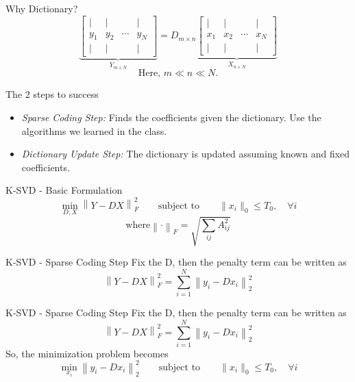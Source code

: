 \documentclass{beamer}
\begin{document}
\begin{frame}{Why Dictionary?}
    \[
    \underbrace{\left[
    \begin{array}{cccc}
    | & | & & | \\
    y_1 & y_2 & \cdots & y_N \\
    | & | & & |
    \end{array}
    \right]}_{Y_{m \times N}}
    =
    D_{m \times n}
    \underbrace{\left[
    \begin{array}{cccc}
    | & | & & | \\
    x_1 & x_2 & \cdots & x_N \\
    | & | & & |
    \end{array}
    \right]}_{X_{n \times N}}
    \]
    \[
    \text{Here, } m \ll n \ll N.
    \]
\end{frame}

\begin{frame}{The 2 steps to success}
\begin{itemize}
    \item \textit{Sparse Coding Step:} Finds the coefficients given the
    dictionary. Use the algorithms we learned in the class.
    \item \textit{Dictionary Update Step:} The dictionary is updated assuming known and fixed coefficients. 
\end{itemize}
\end{frame}

\begin{frame}
\vfill
{}\vfill
\end{frame}


\begin{frame}{K-SVD - Basic Formulation}
    \[
    \min_{D,X} \left\| Y - DX \right\|_F^2
    \qquad
    \text{subject to}
    \qquad
    \|x_i\|_0 \leq T_0,
    \quad \forall i
    \]
    \[
    \text{where} \left\| \cdot \right\|_F = \sqrt{\sum_{ij}A_{ij}^2}
    \]
\end{frame}

\begin{frame}{K-SVD - Sparse Coding Step}
    Fix the D, then the penalty term can be written as
    \[
    \left\|Y - DX \right\|_F^2 = \sum_{i=1}^{N}\left\|y_i - Dx_i \right\|_2^2
    \]
    \vspace{1.8cm}
\end{frame}

\begin{frame}{K-SVD - Sparse Coding Step}
    Fix the D, then the penalty term can be written as
    \[
    \left\|Y - DX \right\|_F^2 = \sum_{i=1}^{N}\left\|y_i - Dx_i \right\|_2^2
    \]
    So, the minimization problem becomes
    \[
    \min_{x_i} \left\| y_i - D x_i \right\|_2^2
    \qquad
    \text{subject to}
    \qquad
    \|x_i\|_0 \leq T_0,
    \quad \forall i
    \]
    \vspace{0.7cm}
\end{frame}
\end{document}
